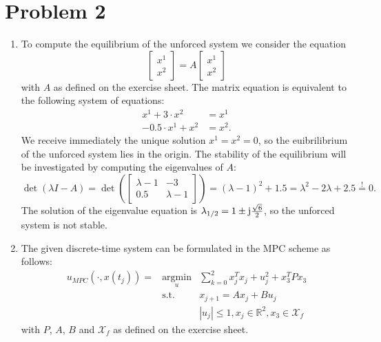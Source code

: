 \documentclass[12pt,pdftex,a4paper]{scrartcl}
\DeclareMathOperator*{\argmin}{argmin}
\begin{document}
\section*{Problem 2}
\begin{enumerate}
    \item To compute the equilibrium of the unforced system we consider the equation
    \begin{equation*}
         \begin{bmatrix}
             x^1 \\ x^2
         \end{bmatrix}
         = A
         \begin{bmatrix}
             x^1 \\ x^2
         \end{bmatrix}
    \end{equation*}
    with $A$ as defined on the exercise sheet. The matrix equation is equivalent to the following system of equations:
    \begin{align*}
         x^1 + 3 \cdot x^2 &= x^1 \\
         -0.5 \cdot x^1 +x^2 &= x^2.
    \end{align*}
    We receive immediately the unique solution $x^1 = x^2 = 0$, so the euibrilibrium of the unforced system lies in the origin. The stability of the equilibrium will be investigated by computing the eigenvalues of $A$:
    \begin{equation*}         
         \det (\lambda I - A) = \det \left(
         \begin{bmatrix}
            \lambda -1 & -3 \\
            0.5 & \lambda -1
         \end{bmatrix}
         \right) = (\lambda -1)^2 +1.5 = \lambda^2 -2 \lambda +2.5 \overset{!}{=} 0.
    \end{equation*}
    The solution of the eigenvalue equation is $\lambda_{1/2} = 1 \pm \im \frac{\sqrt{6}}{2}$, so the unforced system is not stable.
    
    \item The given discrete-time system can be formulated in the MPC scheme as follows:
    \begin{equation} 
    \begin{array}{rcl} 
    u_{MPC} (\cdot , x(t_j)) = &\argmin\limits_u& \sum\limits_{k=0}^2 x_j^T x_j + u_j^2 +x_3^T P x_3 \\ 
    &\mathrm{s.t.}& x_{j+1} = A x_j + B u_j \\ 
    && |u_j| \leq 1, x_j \in \mathbb{R}^2, x_3 \in \mathcal{X}_f
    \end{array}      
    \end{equation}
    with $P$, $A$, $B$ and $\mathcal{X}_f$ as defined on the exercise sheet.
    

\end{enumerate}
\end{document}
